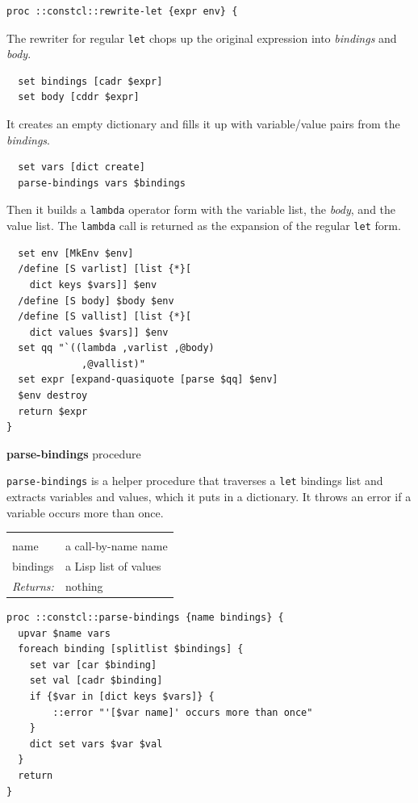 \documentclass[a5paper,draft]{memoir}
\begin{document}
\begin{lstlisting}
proc ::constcl::rewrite-let {expr env} {
\end{lstlisting}

The rewriter for regular \texttt{let} chops up the original expression into \emph{bindings} and \emph{body}.

\begin{lstlisting}
  set bindings [cadr $expr]
  set body [cddr $expr]
\end{lstlisting}

It creates an empty dictionary and fills it up with variable/value pairs from the \emph{bindings}.

\begin{lstlisting}
  set vars [dict create]
  parse-bindings vars $bindings
\end{lstlisting}

Then it builds a \texttt{lambda} operator form with the variable list, the \emph{body}, and the value list. The \texttt{lambda} call is returned as the expansion of the regular \texttt{let} form.

\begin{lstlisting}
  set env [MkEnv $env]
  /define [S varlist] [list {*}[
    dict keys $vars]] $env
  /define [S body] $body $env
  /define [S vallist] [list {*}[
    dict values $vars]] $env
  set qq "`((lambda ,varlist ,@body)
             ,@vallist)"
  set expr [expand-quasiquote [parse $qq] $env]
  $env destroy
  return $expr
}
\end{lstlisting}

\textbf{parse-bindings} procedure

\texttt{parse-bindings} is a helper procedure that traverses a \texttt{let} bindings list and extracts variables and values, which it puts in a dictionary. It throws an error if a variable occurs more than once.

\noindent\begin{tabular}{ |p{1.9cm} p{6.5cm}| }
\hline
\rowcolor[HTML]{CCCCCC} \multicolumn{2}{|l|}{\textbf{parse-bindings (internal)}} \\
name & a call-by-name name \\
bindings & a Lisp list of values \\
\textit{Returns:} & nothing \\
\hline
\end{tabular}

\begin{lstlisting}
proc ::constcl::parse-bindings {name bindings} {
  upvar $name vars
  foreach binding [splitlist $bindings] {
    set var [car $binding]
    set val [cadr $binding]
    if {$var in [dict keys $vars]} {
        ::error "'[$var name]' occurs more than once"
    }
    dict set vars $var $val
  }
  return
}
\end{lstlisting}
\end{document}
